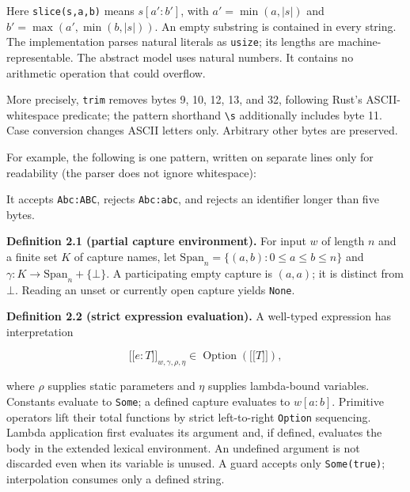 \documentclass[
  11pt,
]{article}
\newenvironment{Shaded}{}{}
\newcommand{\NormalTok}[1]{#1}
\begin{document}
Here \texttt{slice(s,a,b)} means \(s[a':b']\), with \(a'=\min(a,|s|)\)
and \(b'=\max(a',\min(b,|s|))\). An empty substring is contained in
every string. The implementation parses natural literals as
\texttt{usize}; its lengths are machine-representable. The abstract
model uses natural numbers. It contains no arithmetic operation that
could overflow.

More precisely, \texttt{trim} removes bytes 9, 10, 12, 13, and 32,
following Rust's ASCII-whitespace predicate; the pattern shorthand
\texttt{\textbackslash{}s} additionally includes byte 11. Case
conversion changes ASCII letters only. Arbitrary other bytes are
preserved.

For example, the following is one pattern, written on separate lines
only for readability (the parser does not ignore whitespace):

\begin{Shaded}
\end{Shaded}

It accepts \texttt{Abc:ABC}, rejects \texttt{Abc:abc}, and rejects an
identifier longer than five bytes.

\textbf{Definition 2.1 (partial capture environment).} For input \(w\)
of length \(n\) and a finite set \(K\) of capture names, let
\(\mathrm{Span}_n=\{(a,b):0\leq a\leq b\leq n\}\) and
\(\gamma:K\to\mathrm{Span}_n+\{\bot\}\). A participating empty capture
is \((a,a)\); it is distinct from \(\bot\). Reading an unset or
currently open capture yields \texttt{None}.

\textbf{Definition 2.2 (strict expression evaluation).} A well-typed
expression has interpretation

\[
\mathopen{[\![}e:T\mathclose{]\!]}_{w,\gamma,\rho,\eta}\in\operatorname{Option}(\mathopen{[\![}T\mathclose{]\!]}),
\]

where \(\rho\) supplies static parameters and \(\eta\) supplies
lambda-bound variables. Constants evaluate to \texttt{Some}; a defined
capture evaluates to \(w[a:b]\). Primitive operators lift their total
functions by strict left-to-right \texttt{Option} sequencing. Lambda
application first evaluates its argument and, if defined, evaluates the
body in the extended lexical environment. An undefined argument is not
discarded even when its variable is unused. A guard accepts only
\texttt{Some(true)}; interpolation consumes only a defined string.
\end{document}
